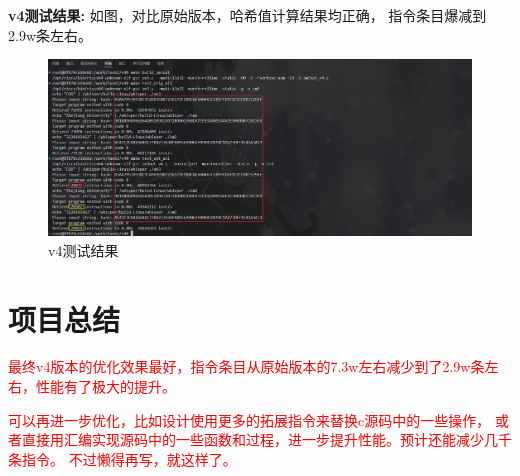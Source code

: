 \documentclass[12pt,hyperref,a4paper,UTF8]{ctexart}
\begin{document}
\textbf{v4测试结果:}
    如图，对比原始版本，哈希值计算结果均正确，
    指令条目爆减到2.9w条左右。
    \begin{figure}[H]
        \centering
        \includegraphics[width =1.0\textwidth]{figures/fig/image32.png}
        \caption{v4测试结果}
    \end{figure}

\section{项目总结}

\textcolor{red}{最终v4版本的优化效果最好，指令条目从原始版本的7.3w左右减少到了2.9w条左右，性能有了极大的提升。}


\textcolor{red}{
可以再进一步优化，比如设计使用更多的拓展指令来替换c源码中的一些操作，
或者直接用汇编实现源码中的一些函数和过程，进一步提升性能。预计还能减少几千条指令。
不过懒得再写，就这样了。
}


\end{document}
